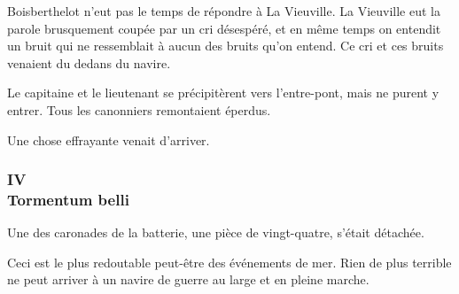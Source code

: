 \documentclass[french,twoside]{book} %
\begin{document}
Boisberthelot n’eut pas le temps de répondre à La Vieuville. La Vieuville eut la parole brusquement coupée par un cri désespéré, et en même temps on  entendit un bruit qui ne ressemblait à aucun des bruits qu’on entend. Ce cri et ces bruits venaient du dedans du navire.\par
Le capitaine et le lieutenant se précipitèrent vers l’entre-pont, mais ne purent y entrer. Tous les canonniers remontaient éperdus.\par
Une chose effrayante venait d’arriver.
 \subsubsection[{IV. Tormentum belli}]{IV \\
Tormentum belli}
\label{p1l2c4}
\noindent Une des caronades de la batterie, une pièce de vingt-quatre, s’était détachée.\par
Ceci est le plus redoutable peut-être des événements de mer. Rien de plus terrible ne peut arriver à un navire de guerre au large et en pleine marche.\par
\end{document}
